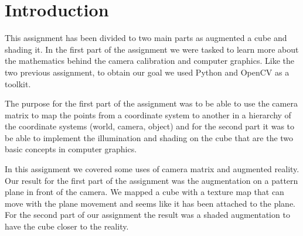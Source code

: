 \pagebreak{}
\section{Introduction}

This assignment has been divided to two main parts as augmented a cube and shading it. In the first part of the assignment we were tasked to learn more about the mathematics behind the camera calibration and computer graphics. Like the two previous assignment, to obtain our goal we used Python and OpenCV as a toolkit.

The purpose for the first part of the assignment was to be able to use the camera matrix to map the points from a coordinate system to another in a hierarchy of the coordinate systems (world, camera, object) and for the second part it was to be able to implement the illumination and shading on the cube that are the two basic concepts in computer graphics. 

In this assignment we covered some uses of camera matrix and augmented reality. Our result for the first part of the assignment was the augmentation on a pattern plane in front of the camera. We mapped a cube with a texture map that can move with the plane movement and seems like it has been attached to the plane. For the second part of our assignment the result was a shaded augmentation to have the cube closer to the reality.
